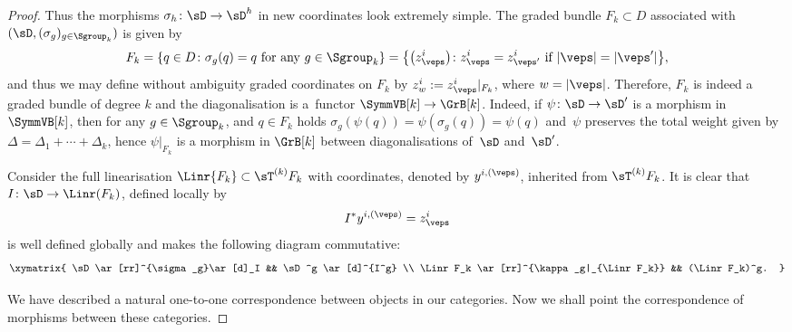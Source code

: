 \begin{proof}
Thus the morphisms $\sigma_h\colon \sD\rightarrow \sD^h$ in new coordinates look extremely simple. The graded bundle $F_k\subset D$ associated with $(\sD, (\sigma_g)_{g\in \Sgroup_k})$ is given by
\begin{gather*}
F_k = \{q\in D\colon \sigma_g(q)=q \ \text{for any} \ g\in \Sgroup_k\} = \big\{\big(z^i_\veps\big)\colon z^i_\veps = z^i_{\veps'} \ \text{if}\ |\veps|=|\veps'|\big\},
\end{gather*}
and thus we may def\/ine without ambiguity graded coordinates on $F_k$ by $z^i_w := z^i_\veps|_{F_k}$, where $w=|\veps|$. Therefore, $F_k$ is indeed a graded bundle of degree $k$ and the diagonalisation is a~functor $\SymmVB[k] \to \GrB[k]$. Indeed, if $\psi\colon \sD\to \sD'$ is a morphism in~$\SymmVB[k]$, then for any $g\in\Sgroup_k$, and $q\in F_k$ holds $\sigma_g(\psi(q)) =\psi(\sigma_g(q)) = \psi(q)$ and~$\psi$ preserves the total weight given by $\Delta = \Delta_1+\cdots+\Delta_k$, hence $\psi|_{F_k}$ is a morphism in $\GrB[k]$ between diagonalisations of~$\sD$ and~$\sD'$.

Consider the full linearisation $\Linr{F_k}\subset \sT^{(k)} F_k$ with coordinates, denoted by $y^{i, (\veps)}$, inherited from $\sT^{(k)} F_k$. It is clear that $I\colon \sD\rightarrow \Linr(F_k)$, def\/ined locally by
\begin{gather*}
I^* y^{i, (\veps)} =z^i_\veps
\end{gather*}
is well def\/ined globally and makes the following diagram commutative:
\begin{gather*}
 \xymatrix{
 \sD \ar[rr]^{\sigma_g}\ar[d]_I && \sD^g \ar[d]^{I^g} \\
 \Linr F_k \ar[rr]^{\kappa_g|_{\Linr F_k}} && (\Linr F_k)^g. }
 \end{gather*}

We have described a natural one-to-one correspondence between objects in our categories. Now we shall point the correspondence of morphisms between these categories.


\end{proof}
